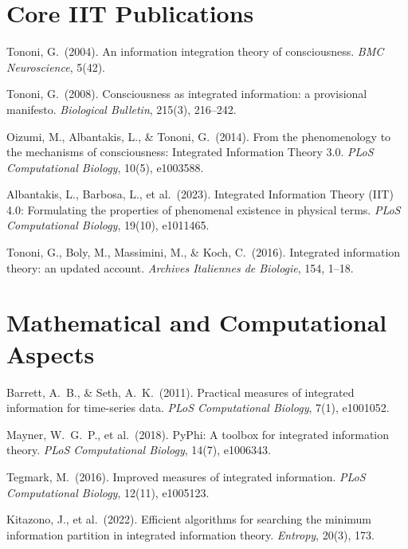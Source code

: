 \documentclass[11pt,a4paper]{report}
\begin{document}
\section*{Core IIT Publications}
\begin{enumerate}[label={[\arabic*]}, leftmargin=2.5em]
  \item Tononi, G.\ (2004). An information integration theory of consciousness. \textit{BMC Neuroscience}, 5(42).
  \item Tononi, G.\ (2008). Consciousness as integrated information: a provisional manifesto. \textit{Biological Bulletin}, 215(3), 216--242.
  \item Oizumi, M., Albantakis, L., \& Tononi, G.\ (2014). From the phenomenology to the mechanisms of consciousness: Integrated Information Theory 3.0. \textit{PLoS Computational Biology}, 10(5), e1003588.
  \item Albantakis, L., Barbosa, L., et al.\ (2023). Integrated Information Theory (IIT) 4.0: Formulating the properties of phenomenal existence in physical terms. \textit{PLoS Computational Biology}, 19(10), e1011465.
  \item Tononi, G., Boly, M., Massimini, M., \& Koch, C.\ (2016). Integrated information theory: an updated account. \textit{Archives Italiennes de Biologie}, 154, 1--18.
\end{enumerate}

\section*{Mathematical and Computational Aspects}
\begin{enumerate}[label={[\arabic*]}, leftmargin=2.5em, start=6]
  \item Barrett, A.\ B., \& Seth, A.\ K.\ (2011). Practical measures of integrated information for time-series data. \textit{PLoS Computational Biology}, 7(1), e1001052.
  \item Mayner, W.\ G.\ P., et al.\ (2018). PyPhi: A toolbox for integrated information theory. \textit{PLoS Computational Biology}, 14(7), e1006343.
  \item Tegmark, M.\ (2016). Improved measures of integrated information. \textit{PLoS Computational Biology}, 12(11), e1005123.
  \item Kitazono, J., et al.\ (2022). Efficient algorithms for searching the minimum information partition in integrated information theory. \textit{Entropy}, 20(3), 173.
\end{enumerate}
\end{document}
